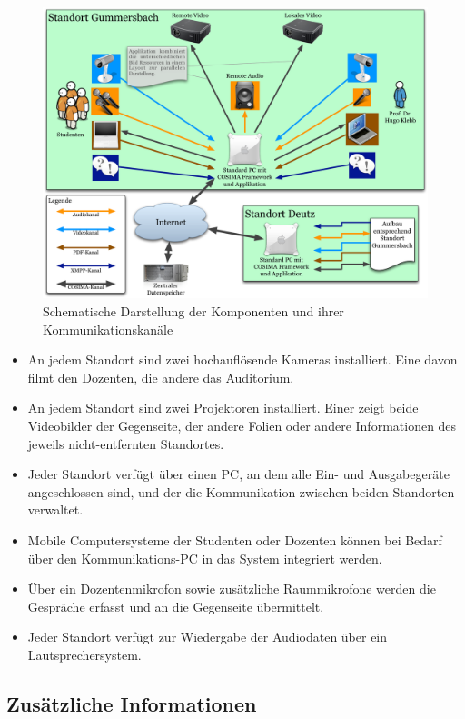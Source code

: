   \begin{figure}[ht]
    \centering
      \includegraphics[width=.9\textwidth]{images/Hardware_und_Kanaele.pdf}
    \caption{Schematische Darstellung der Komponenten und ihrer Kommunikationskanäle}
    \label{fig:images_Hardware_und_Kanaele}
  \end{figure}
  
  \begin{itemize}
    \item An jedem Standort sind zwei hochauflösende Kameras installiert. Eine davon filmt den Dozenten, die andere das Auditorium.
    \item An jedem Standort sind zwei Projektoren installiert. Einer zeigt beide Videobilder der Gegenseite, der andere Folien oder andere Informationen des jeweils nicht-entfernten Standortes.
    \item Jeder Standort verfügt über einen PC, an dem alle Ein- und Ausgabegeräte angeschlossen sind, und der die Kommunikation zwischen beiden Standorten verwaltet.
    \item Mobile Computersysteme der Studenten oder Dozenten können bei Bedarf über den Kommunikations-PC in das System integriert werden.
    \item Über ein Dozentenmikrofon sowie zusätzliche Raummikrofone werden die Gespräche erfasst und an die Gegenseite übermittelt.
    \item Jeder Standort verfügt zur Wiedergabe der Audiodaten über ein Lautsprechersystem.
  \end{itemize}
  
\subsection{Zusätzliche Informationen} %
\label{sub:zusaetzliche_informationen}

